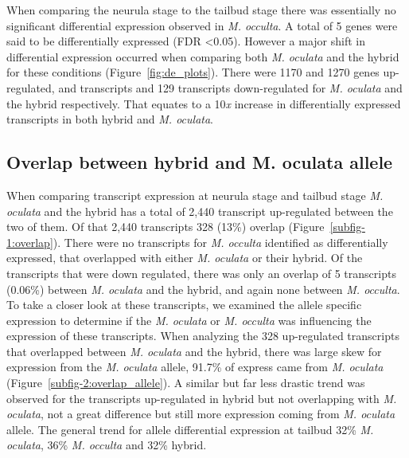 When comparing the neurula stage to the tailbud stage there was essentially no significant differential expression observed in \textit{M. occulta}. A total of 5 genes were said to be differentially expressed (FDR \textless 0.05). However a major shift in differential expression occurred when comparing both \textit{M. oculata} and the hybrid for these conditions (Figure~\ref{fig:de_plots}). There were 1170 and 1270 genes up-regulated, and transcripts and 129 transcripts down-regulated for \textit{M. oculata} and the hybrid respectively. That equates to a 10\textit{x} increase in differentially expressed transcripts in both hybrid and \textit{M. oculata}.

\subsection{Overlap between hybrid and M. oculata allele }
When comparing transcript expression at neurula stage and tailbud stage \textit{M. oculata} and the hybrid has a total of 2,440 transcript up-regulated between the two of them. Of that 2,440 transcripts 328 (13\%) overlap (Figure~\ref{subfig-1:overlap}). There were no transcripts for \textit{M. occulta} identified as differentially expressed, that overlapped with either \textit{M. oculata} or their hybrid. Of the transcripts that were down regulated, there was only an overlap of 5 transcripts (0.06\%) between \textit{M. oculata} and the hybrid, and again none between \textit{M. occulta}. To take a closer look at these transcripts, we examined the allele specific expression to determine if the \textit{M. oculata} or \textit{M. occulta} was influencing the expression of these transcripts. When analyzing the 328 up-regulated transcripts that overlapped between \textit{M. oculata} and the hybrid, there was large skew for expression from the \textit{M. oculata} allele, 91.7\% of express came from \textit{M. oculata} (Figure~\ref{subfig-2:overlap_allele}). A similar but far less drastic trend was observed for the transcripts up-regulated in hybrid but not overlapping with \textit{M. oculata}, not a great difference but still more expression coming from \textit{M. oculata} allele. The general trend for allele differential expression at tailbud 32\% \textit{M. oculata}, 36\% \textit{M. occulta} and 32\% hybrid.

